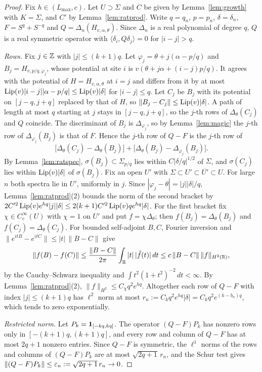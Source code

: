 \begin{proof}
Fix $h\in(L_{\max},c)$. Let $U\supset\Sigma$ and $C$ be given by Lemma~\ref{lem:growth} with $K=\Sigma$, and $C'$ by Lemma~\ref{lem:ratprod}. Write $q=q_n$, $p=p_n$, $\delta=\delta_n$, $F=S^q+S^{-q}$ and $Q=\Delta_n(H_{v,\alpha,\theta})$. Since $\Delta_n$ is a real polynomial of degree $q$, $Q$ is a real symmetric operator with $\langle\delta_i,Q\delta_j\rangle=0$ for $|i-j|>q$.

\emph{Rows.} Fix $j\in\mathbb Z$ with $|j|\le(k+1)q$. Let $\varphi_j=\theta+j(\alpha-p/q)$ and $B_j=H_{v,p/q,\varphi_j}$, whose potential at site $i$ is $v(\theta+j\alpha+(i-j)p/q)$. It agrees with the potential of $H=H_{v,\alpha,\theta}$ at $i=j$ and differs from it by at most $\operatorname{Lip}(v)|i-j||\alpha-p/q|\le\operatorname{Lip}(v)|\delta|$ for $|i-j|\le q$. Let $C_j$ be $B_j$ with its potential on $[j-q,j+q]$ replaced by that of $H$, so $\|B_j-C_j\|\le\operatorname{Lip}(v)|\delta|$. A path of length at most $q$ starting at $j$ stays in $[j-q,j+q]$, so the $j$-th rows of $\Delta_\theta(C_j)$ and $Q$ coincide. The discriminant of $B_j$ is $\Delta_{\varphi_j}$, so by Lemma~\ref{lem:magic} the $j$-th row of $\Delta_{\varphi_j}(B_j)$ is that of $F$. Hence the $j$-th row of $Q-F$ is the $j$-th row of
\[
\bigl[\Delta_\theta(C_j)-\Delta_\theta(B_j)\bigr]+\bigl[\Delta_\theta(B_j)-\Delta_{\varphi_j}(B_j)\bigr].
\]
By Lemma~\ref{lem:ratspec}, $\sigma(B_j)\subset\Sigma_{p/q}$ lies within $C|\delta/q|^{1/2}$ of $\Sigma$, and $\sigma(C_j)$ lies within $\operatorname{Lip}(v)|\delta|$ of $\sigma(B_j)$. Fix an open $U'$ with $\Sigma\subset U'\subset\overline{U'}\subset U$. For large $n$ both spectra lie in $U'$, uniformly in $j$. Since $|\varphi_j-\theta|=|j||\delta|/q$, Lemma~\ref{lem:ratprod}(2) bounds the norm of the second bracket by $2C'^2\operatorname{Lip}(v)e^{hq}|j||\delta|\le2(k+1)C'^2\operatorname{Lip}(v)qe^{hq}|\delta|$. For the first bracket fix $\chi\in C_c^\infty(U)$ with $\chi=1$ on $U'$ and put $f=\chi\Delta_\theta$; then $f(B_j)=\Delta_\theta(B_j)$ and $f(C_j)=\Delta_\theta(C_j)$. For bounded self-adjoint $B,C$, Fourier inversion and $\|e^{itB}-e^{itC}\|\le|t|\,\|B-C\|$ give
\[
\|f(B)-f(C)\|\le\frac{\|B-C\|}{2\pi}\int_\mathbb R|t|\,|\hat f(t)|\,dt\le c\,\|B-C\|\,\|f\|_{H^2(\mathbb R)},
\]
by the Cauchy--Schwarz inequality and $\int t^2(1+t^2)^{-2}\,dt<\infty$. By Lemma~\ref{lem:ratprod}(2), $\|f\|_{H^2}\le C_\chi q^2e^{hq}$. Altogether each row of $Q-F$ with index $|j|\le(k+1)q$ has $\ell^2$ norm at most $r_n:=C_kq^2e^{hq}|\delta|=C_kq^2e^{(h-b_n)q}$, which tends to zero exponentially.

\emph{Restricted norm.} Let $P_k=\mathbf 1_{[-kq,kq]}$. The operator $(Q-F)P_k$ has nonzero rows only in $[-(k+1)q,(k+1)q]$, and every row and column of $Q-F$ has at most $2q+1$ nonzero entries. Since $Q-F$ is symmetric, the $\ell^1$ norms of the rows and columns of $(Q-F)P_k$ are at most $\sqrt{2q+1}\,r_n$, and the Schur test gives $\|(Q-F)P_k\|\le\varepsilon_n:=\sqrt{2q+1}\,r_n\to0$.


\end{proof}
